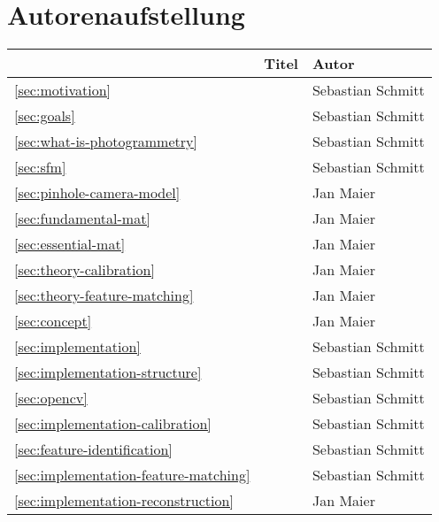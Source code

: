 \section*{Autorenaufstellung}\label{sec:authors}
\begin{tabularx}{\textwidth}{lXl}
 & Titel & Autor \\ \hline
\autoref{sec:motivation} & \nameref{sec:motivation}       & Sebastian Schmitt       \\
\autoref{sec:goals} & \nameref{sec:goals}       & Sebastian Schmitt       \\
\autoref{sec:what-is-photogrammetry} & \nameref{sec:what-is-photogrammetry}       & Sebastian Schmitt       \\
\autoref{sec:sfm} & \nameref{sec:sfm}       & Sebastian Schmitt       \\
\autoref{sec:pinhole-camera-model} & \nameref{sec:pinhole-camera-model}       & Jan Maier       \\
\autoref{sec:fundamental-mat} & \nameref{sec:fundamental-mat}       & Jan Maier       \\
\autoref{sec:essential-mat} & \nameref{sec:essential-mat}       & Jan Maier       \\
\autoref{sec:theory-calibration} & \nameref{sec:theory-calibration}       & Jan Maier       \\
\autoref{sec:theory-feature-matching} & \nameref{sec:theory-feature-matching}       & Jan Maier       \\
\autoref{sec:concept} & \nameref{sec:concept}       & Jan Maier       \\
\autoref{sec:implementation} & \nameref{sec:implementation}       & Sebastian Schmitt       \\
\autoref{sec:implementation-structure} & \nameref{sec:implementation-structure}       & Sebastian Schmitt       \\
\autoref{sec:opencv} & \nameref{sec:opencv}       & Sebastian Schmitt       \\
\autoref{sec:implementation-calibration} & \nameref{sec:implementation-calibration}       & Sebastian Schmitt       \\
\autoref{sec:feature-identification} & \nameref{sec:feature-identification}       & Sebastian Schmitt       \\
\autoref{sec:implementation-feature-matching} & \nameref{sec:implementation-feature-matching}       & Sebastian Schmitt       \\
\autoref{sec:implementation-reconstruction} & \nameref{sec:implementation-reconstruction}       & Jan Maier       \\

\end{tabularx}
